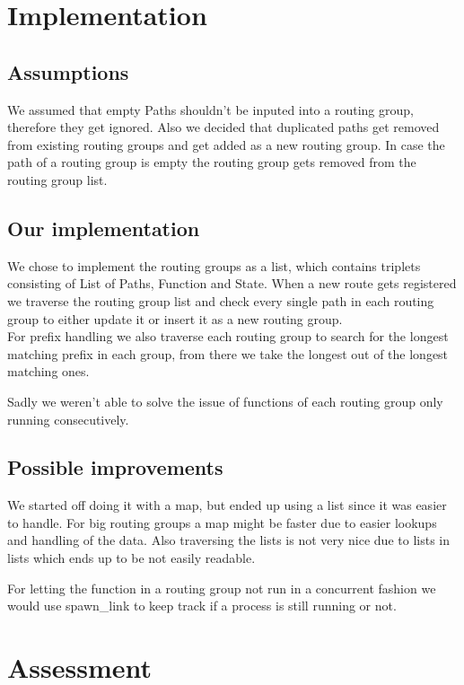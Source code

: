 \documentclass[12pt,a4paper]{article}
\begin{document}
\section{Implementation}

\subsection{Assumptions}
We assumed that empty Paths shouldn't be inputed into a routing group, therefore they get ignored.
Also we decided that duplicated paths get removed from existing routing groups and get added as a new routing group.
In case the path of a routing group is empty the routing group gets removed from the routing group list.

\subsection{Our implementation}
We chose to implement the routing groups as a list, which contains triplets consisting of List of Paths, Function and State.
When a new route gets registered we traverse the routing group list and check every single path in each routing group to either update it or insert it as a new routing group.\\
For prefix handling we also traverse each routing group to search for the longest matching prefix in each group, from there we take the longest out of the longest matching ones.

Sadly we weren't able to solve the issue of functions of each routing group only running consecutively.

\subsection{Possible improvements}
We started off doing it with a map, but ended up using a list since it was easier to handle.
For big routing groups a map might be faster due to easier lookups and handling of the data.
Also traversing the lists is not very nice due to lists in lists which ends up to be not easily readable.

For letting the function in a routing group not run in a concurrent fashion we would use spawn\_link to keep track if a process is still running or not.

\section{Assessment}
\end{document}
